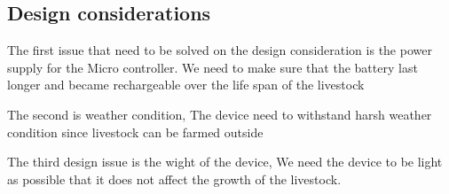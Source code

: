 \subsection{Design considerations}

The first issue that need to be solved on the design consideration is the power
supply for the Micro controller. We need to make sure that the battery last
longer and became rechargeable over the life span of the livestock

The second is weather condition, The device need to withstand harsh weather
condition since livestock can be farmed outside

The third design issue is the wight of the device, We need the device to be light as possible that it
does not affect the growth of the livestock.
